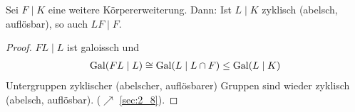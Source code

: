 \begin{lemma}
	Sei $F \mid K$ eine weitere Körpererweiterung. Dann: Ist $L \mid K$ zyklisch (abelsch, auflösbar), so auch $LF \mid F$.
\end{lemma}
\begin{proof}
	$FL \mid L$ ist galoissch und
	\begin{align*}
		\operatorname{Gal}(FL \mid L) \cong \operatorname{Gal}(L \mid L \cap F) \le \operatorname{Gal}(L \mid K)
	\end{align*}
	Untergruppen zyklischer (abelscher, auflösbarer) Gruppen sind wieder zyklisch (abelsch, auflösbar). ($\nearrow$ \cref{sec:2_8}).
\end{proof}